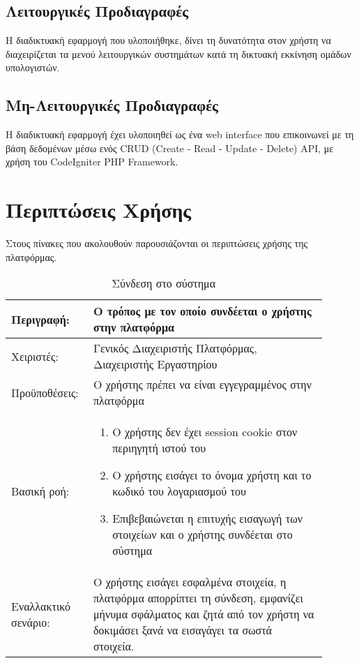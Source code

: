 \subsection{Λειτουργικές Προδιαγραφές}
Η διαδικτυακή εφαρμογή που υλοποιήθηκε, δίνει τη δυνατότητα στον χρήστη να διαχειρίζεται τα μενού λειτουργικών συστημάτων κατά τη δικτυακή εκκίνηση ομάδων υπολογιστών.

\subsection{Μη-Λειτουργικές Προδιαγραφές}
Η διαδικτυακή εφαρμογή έχει υλοποιηθεί ως ένα web interface που επικοινωνεί με τη βάση δεδομένων μέσω ενός CRUD (Create - Read - Update - Delete) API, με χρήση του CodeIgniter PHP Framework.

\section{Περιπτώσεις Χρήσης}
Στους πίνακες που ακολουθούν παρουσιάζονται οι περιπτώσεις χρήσης της πλατφόρμας.

\begin{table}[h]
	\caption{Σύνδεση στο σύστημα}
	\label{tab:use-case-login}
	\begin{tabular}{|p{0.2\linewidth}|p{0.7\linewidth}|}
		\hline
		Περιγραφή: & Ο τρόπος με τον οποίο συνδέεται ο χρήστης στην πλατφόρμα \\ \hline
		Χειριστές: & Γενικός Διαχειριστής Πλατφόρμας, Διαχειριστής Εργαστηρίου \\ \hline
		Προϋποθέσεις: & Ο χρήστης πρέπει να είναι εγγεγραμμένος στην πλατφόρμα \\ \hline
		Βασική ροή: & 
		\begin{enumerate}
			\item Ο χρήστης δεν έχει session cookie στον περιηγητή ιστού του
			\item Ο χρήστης εισάγει το όνομα χρήστη και το κωδικό του λογαριασμού του
			\item Επιβεβαιώνεται η επιτυχής εισαγωγή των στοιχείων και ο χρήστης συνδέεται στο σύστημα
		\end{enumerate} \\ \hline
		Εναλλακτικό σενάριο: & O χρήστης εισάγει εσφαλμένα στοιχεία, η πλατφόρμα απορρίπτει τη σύνδεση, εμφανίζει μήνυμα σφάλματος και ζητά από τον χρήστη να δοκιμάσει ξανά να εισαγάγει τα σωστά στοιχεία. \\ \hline
	\end{tabular}
\end{table}


